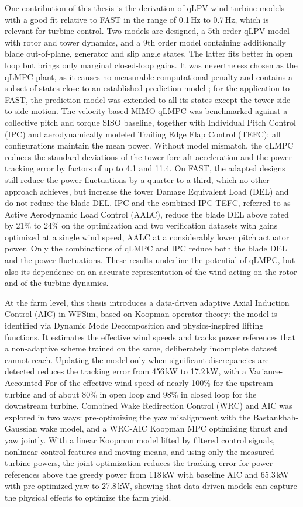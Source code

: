 One contribution of this thesis is the derivation of qLPV wind turbine models with a good fit relative to FAST in the range of 0.1\,Hz to 0.7\,Hz, which is relevant for turbine control. Two models are designed, a 5th order qLPV model with rotor and tower dynamics, and a 9th order model containing additionally blade out-of-plane, generator and slip angle states. The latter fits better in open loop but brings only marginal closed-loop gains. It was nevertheless chosen as the qLMPC plant, as it causes no measurable computational penalty and contains a subset of states close to an established prediction model \cite{Bianchi2007}; for the application to FAST, the prediction model was extended to all its states except the tower side-to-side motion. The velocity-based MIMO qLMPC was benchmarked against a collective pitch and torque SISO baseline, together with Individual Pitch Control (IPC) and aerodynamically modeled Trailing Edge Flap Control (TEFC); all configurations maintain the mean power. Without model mismatch, the qLMPC reduces the standard deviations of the tower fore-aft acceleration and the power tracking error by factors of up to 4.1 and 11.4. On FAST, the adapted designs still reduce the power fluctuations by a quarter to a third, which no other approach achieves, but increase the tower Damage Equivalent Load (DEL) and do not reduce the blade DEL. IPC and the combined IPC-TEFC, referred to as Active Aerodynamic Load Control (AALC), reduce the blade DEL above rated by 21\% to 24\% on the optimization and two verification datasets with gains optimized at a single wind speed, AALC at a considerably lower pitch actuator power. Only the combinations of qLMPC and IPC reduce both the blade DEL and the power fluctuations. These results underline the potential of qLMPC, but also its dependence on an accurate representation of the wind acting on the rotor and of the turbine dynamics.

At the farm level, this thesis introduces a data-driven adaptive Axial Induction Control (AIC) in WFSim, based on Koopman operator theory: the model is identified via Dynamic Mode Decomposition and physics-inspired lifting functions. It estimates the effective wind speeds and tracks power references that a non-adaptive scheme trained on the same, deliberately incomplete dataset cannot reach. Updating the model only when significant discrepancies are detected reduces the tracking error from 456\,kW to 17.2\,kW, with a Variance-Accounted-For of the effective wind speed of nearly 100\% for the upstream turbine and of about 80\% in open loop and 98\% in closed loop for the downstream turbine. Combined Wake Redirection Control (WRC) and AIC was explored in two ways: pre-optimizing the yaw misalignment with the Bastankhah-Gaussian wake model, and a WRC-AIC Koopman MPC optimizing thrust and yaw jointly. With a linear Koopman model lifted by filtered control signals, nonlinear control features and moving means, and using only the measured turbine powers, the joint optimization reduces the tracking error for power references above the greedy power from 118\,kW with baseline AIC and 65.3\,kW with pre-optimized yaw to 27.8\,kW, showing that data-driven models can capture the physical effects to optimize the farm yield.
